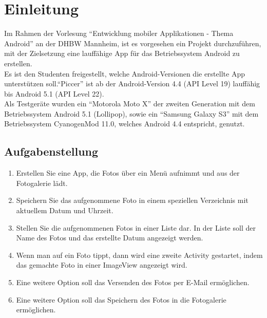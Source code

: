 
\chapter{Einleitung}


Im Rahmen der Vorlesung \enquote{Entwicklung mobiler Applikationen - Thema Android} an der DHBW Mannheim, ist es vorgesehen ein Projekt durchzuführen, mit der Zielsetzung eine lauffähige App für das Betriebssystem Android zu erstellen.
\\Es ist den Studenten freigestellt, welche Android-Versionen die erstellte App unterstützen soll.\enquote{Piccer} ist ab der Android-Version 4.4 (API Level 19) lauffähig bis Android 5.1 (API Level 22).
\\Als Testgeräte wurden ein \enquote{Motorola Moto X} der zweiten Generation mit dem Betriebssystem Android 5.1 (Lollipop), sowie ein \enquote{Samsung Galaxy S3} mit dem Betriebssystem CyanogenMod 11.0, welches Android 4.4 entspricht, genutzt.


\section{Aufgabenstellung}
\begin{enumerate}
\item Erstellen Sie eine App, die Fotos über ein Menü aufnimmt und aus der Fotogalerie lädt.
\item Speichern Sie das aufgenommene Foto in einem speziellen Verzeichnis mit aktuellem Datum und Uhrzeit.
\item Stellen Sie die aufgenommenen Fotos in einer Liste dar. In der Liste soll der Name des Fotos und das erstellte Datum angezeigt werden.
\item Wenn man auf ein Foto tippt, dann wird eine zweite Activity gestartet, indem das gemachte Foto in einer ImageView angezeigt wird.
\item Eine weitere Option soll das Versenden des Fotos per E-Mail ermöglichen.
\item Eine weitere Option soll das Speichern des Fotos in die Fotogalerie ermöglichen.
\end{enumerate}

\newpage

